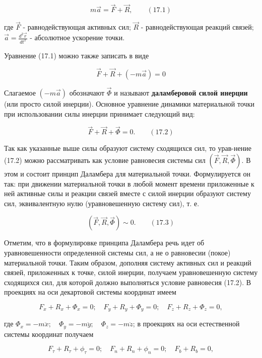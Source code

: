 {\begin{center}
	  $$m \vec a = \vec F + \vec R, \qquad (17.1)$$

	  \par где $\vec F$ - равнодействующая активных сил; $\vec R$ - равнодействующая реакций связей; $\vec a = \frac{d^2 \vec r}{d t^2}$ - абсолютное ускорение точки.

	  \par Уравнение (17.1) можно также записать в виде

	  $$\vec F + \vec R + (-m \vec a) = 0$$

	  \par Слагаемое $(-m \vec a)$ обозначают $\vec\Phi$ и называют \textbf{даламберовой силой инерции} (или просто силой инерции). Основное уравнение динамики материальной точки при использовании силы инерции принимает следующий вид:
	  
	  $$\vec F + \vec R + \vec\Phi = 0. \qquad (17.2)$$

	  \par Так как указанные выше силы образуют систему сходящихся сил, то урав-нение  (17.2)  можно  рассматривать  как  условие  равновесия  системы  сил $(\vec F, \vec R, \vec\Phi)$. В  этом  и  состоит  принцип  Даламбера  для  материальной  точки. Формулируется он так: при движении материальной точки в любой момент времени приложенные к ней активные силы и реакции связей вместе с силой инерции образуют систему сил, эквивалентную нулю (уравновешенную систему сил), т. е.
	  
	  $$(\vec F, \vec R, \vec\Phi) \sim 0. \qquad (17.3)$$

	  \par Отметим, что в формулировке принципа Даламбера речь идет об уравновешенности определенной системы сил, а не о равновесии (покое) материальной точки. Таким образом, дополняя систему активных сил и реакций связей, приложенных к точке, силой инерции, получаем уравновешенную систему сходящихся сил, для которой должно выполняться условие равновесия (17.2). В проекциях на оси декартовой системы координат имеем

	  $$ F_x + R_x + \Phi_x = 0; \quad  F_y + R_y + \Phi_y = 0; \quad F_z + R_z + \Phi_z = 0,$$

	  \par где $\Phi_x = -m \ddot x; \quad \Phi_y = -m \ddot y; \quad \Phi_z = -m \ddot z$; в проекциях на оси естественной системы координат получаем

	  $$ F_{\tau} + R_{\tau} + \phi_{\tau} = 0; \quad F_{n} + R_{n} + \phi_{n} = 0; \quad F_b + R_b = 0,$$


\end{center}}
